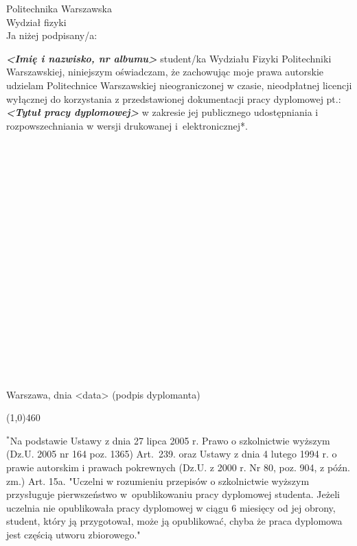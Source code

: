 \setcounter{page}{9}
\vspace{-1.5cm}
\begin{flushleft}
	Politechnika Warszawska \\ 
	Wydział fizyki \\
	\vspace{0.5cm}
	Ja niżej podpisany/a: 
\end{flushleft}
\center \textit{\textbf{<Imię i nazwisko, nr albumu>}} %
\justify student/ka Wydziału Fizyki Politechniki Warszawskiej, niniejszym oświadczam, że zachowując moje prawa autorskie udzielam Politechnice Warszawskiej nieograniczonej w czasie, nieodpłatnej licencji wyłącznej do korzystania z przedstawionej dokumentacji pracy dyplomowej pt.:
\center \textit{\textbf{<Tytuł pracy dyplomowej>}} %
\justify w zakresie jej publicznego udostępniania i rozpowszechniania w wersji drukowanej i~elektronicznej*.
\\~\\~\\~\\~\\~\\~\\~\\~\\~\\~\\~\\~\\~\\~\\~\\~\\~\\~\\~\\
Warszawa, dnia <data> \hfill (podpis dyplomanta) %

\begin{center}
	\color{plum}
	\line(1,0){460}
\end{center}
\footnotesize \noindent $^{*}$Na podstawie Ustawy z dnia 27 lipca 2005 r. Prawo o szkolnictwie wyższym (Dz.U. 2005 nr 164 poz. 1365) Art.~239. oraz Ustawy z dnia 4 lutego 1994 r. o prawie autorskim i prawach pokrewnych (Dz.U. z 2000 r. Nr 80, poz. 904, z późn. zm.) Art. 15a. "Uczelni w rozumieniu przepisów o szkolnictwie wyższym przysługuje pierwszeństwo w~opublikowaniu pracy dyplomowej studenta. Jeżeli uczelnia nie opublikowała pracy dyplomowej w ciągu 6 miesięcy od jej obrony, student, który ją przygotował, może ją opublikować, chyba że praca dyplomowa jest częścią utworu zbiorowego."

\newpage
\thispagestyle{empty}
\phantom{Nothing here}

